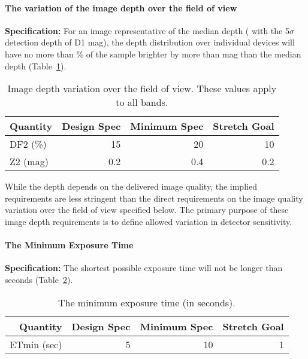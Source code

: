 \paragraph{The variation of the image depth over the field of view\\}

\textbf{Specification:} For an image representative of the median depth (\ie
 with the 5$\sigma$ detection depth of D1 mag), the depth distribution
over individual devices will have no more than
\% of the sample brighter by more than
mag than the median depth (Table~\ref{depthVarFOV}).

\begin{table}[h]
\begin{tabular}{|l|r|r|r|}
\hline
Quantity   & Design Spec & Minimum Spec & Stretch Goal       \\
\hline
      DF2 (\%) &    15       &      20     &      10         \\
      Z2 (mag) &    0.2      &      0.4    &     0.2         \\
\hline
\end{tabular}
\caption{Image depth variation over the field of view. These values
apply to all bands.}
\label{depthVarFOV}
\end{table}

While the depth depends on the delivered image quality, the implied
requirements are less stringent than the direct requirements on the image
quality variation over the field of view specified below.  The primary
purpose of these image depth requirements is to define allowed variation in
detector sensitivity.


\newpage
\paragraph{The Minimum Exposure Time\\}

\textbf{Specification:} The shortest possible exposure time will not be
longer than
seconds (Table~\ref{minTexp}).


\begin{table}[h]
\begin{tabular}{|r|r|r|r|}
\hline
Quantity   & Design Spec & Minimum Spec & Stretch Goal           \\
\hline
      ETmin (sec)  &      5       &      10      &       1       \\
\hline
\end{tabular}
\caption{The minimum exposure time (in seconds). }
\label{minTexp}
\end{table}

